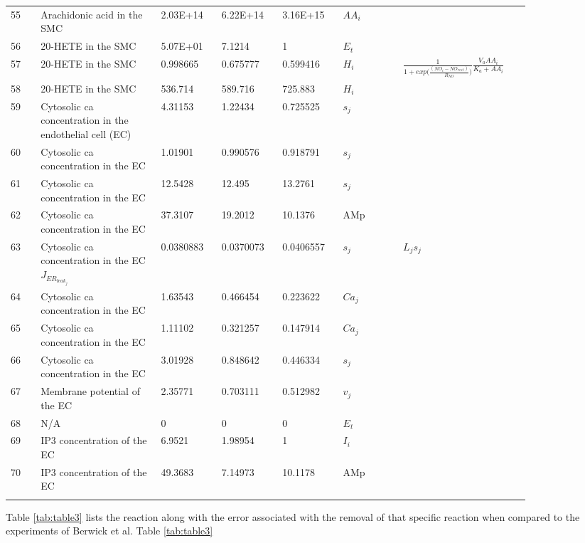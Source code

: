 \documentclass[]{article}
\newcommand{\ca}{\gls{ca}\xspace}
\begin{document}
\begin{longtable}[h!] { p{0.05\linewidth}  p{0.2\linewidth} p{0.1\linewidth}  p{0.10\linewidth} p{0.10\linewidth} p{0.1\linewidth}   p{0.2\linewidth} }
55	&Arachidonic acid in the SMC&	2.03E+14	&	6.22E+14	&	3.16E+15	&$AA_i$\\
56	&20-HETE in the SMC&	5.07E+01	&	7.1214	&	1&	$E_t$\\
57	&20-HETE in the SMC	&0.998665	&	0.675777	&	0.599416&	$H_i$&$\frac{1}{1+{exp(\frac{(NO_i-NO_{rest})}{R_{NO}}})}\frac{V_a AA_i}{K_a+AA_i} $\\
58	&20-HETE in the SMC	&536.714	&	589.716	&	725.883	&$H_i$\\
59	&Cytosolic \ca concentration in the endothelial cell (EC)	&4.31153	&	1.22434	&	0.725525&	$s_j$\\
60	&Cytosolic \ca concentration in the EC	&1.01901	&	0.990576	&	0.918791&	$s_j$\\
61	&Cytosolic \ca concentration in the EC	&12.5428	&	12.495	&	13.2761&	$s_j$\\
62	&Cytosolic \ca concentration in the EC	&37.3107	&	19.2012		&10.1376	&AMp\\
63	&Cytosolic \ca concentration in the EC$J_{ER_{leak_{j}}}$&	0.0380883	&	0.0370073	&	0.0406557	&$s_j$&$ L_{j}s_j $ \\
64	&Cytosolic \ca concentration in the EC	&1.63543	&	0.466454	&	0.223622&	$Ca_j$\\
65&	Cytosolic \ca concentration in the EC&	1.11102		&0.321257	&	0.147914	&$Ca_j$\\
66	&Cytosolic \ca concentration in the EC	&3.01928	&	0.848642	&	0.446334&	$s_j$\\
67	&Membrane potential of the EC&	2.35771	&	0.703111	&	0.512982&	$v_j$\\
68	&N/A	&0	&	0	&	0&	$E_t$\\
69	&IP3 concentration of the EC&	6.9521	&	1.98954	&	1&	$I_i$\\
70&	IP3 concentration of the EC	&49.3683	&	7.14973	&	10.1178&	AMp\\
\label{tab:table2}
\end{longtable}
Table \ref{tab:table3} lists the reaction along with the error associated with the removal of that specific reaction when compared to the experiments of Berwick et al. 
Table \ref{tab:table3}
\end{document}
